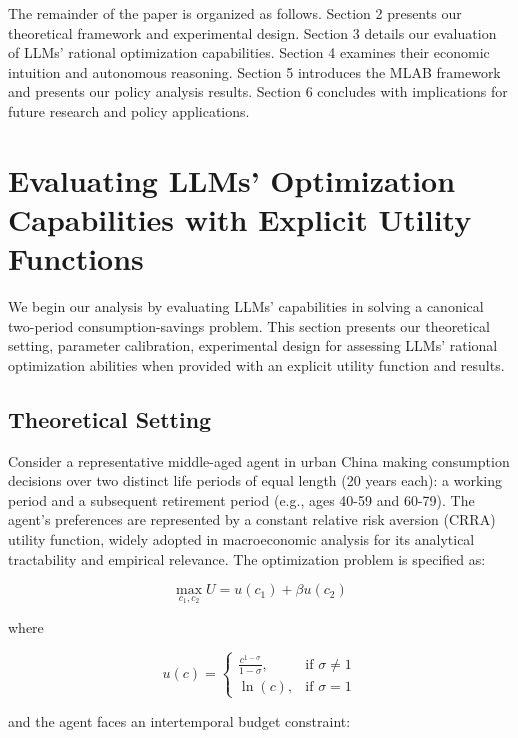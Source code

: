 \documentclass[12pt]{article}
\begin{document}
\begin{CJK*}{UTF8}{gbsn}
The remainder of the paper is organized as follows. Section 2 presents our theoretical framework and experimental design. Section 3 details our evaluation of LLMs' rational optimization capabilities. Section 4 examines their economic intuition and autonomous reasoning. Section 5 introduces the MLAB framework and presents our policy analysis results. Section 6 concludes with implications for future research and policy applications.

\section{Evaluating LLMs' Optimization Capabilities with Explicit Utility Functions}

We begin our analysis by evaluating LLMs' capabilities in solving a canonical two-period consumption-savings problem. This section presents our theoretical setting, parameter calibration, experimental design for assessing LLMs' rational optimization abilities when provided with an explicit utility function and results.

\subsection{Theoretical Setting}

Consider a representative middle-aged agent in urban China making consumption decisions over two distinct life periods of equal length (20 years each): a working period and a subsequent retirement period (e.g., ages 40-59 and 60-79). The agent's preferences are represented by a constant relative risk aversion (CRRA) utility function, widely adopted in macroeconomic analysis for its analytical tractability and empirical relevance. The optimization problem is specified as:

\begin{equation}
\max_{c_1,c_2} U = u(c_1) + \beta u(c_2)
\end{equation}

where

\begin{equation}
u(c) = \begin{cases}
\frac{c^{1-\sigma}}{1-\sigma}, & \text{if } \sigma \neq 1 \\
\ln(c), & \text{if } \sigma = 1
\end{cases}
\end{equation}

and the agent faces an intertemporal budget constraint:


\end{CJK*}
\end{document}

